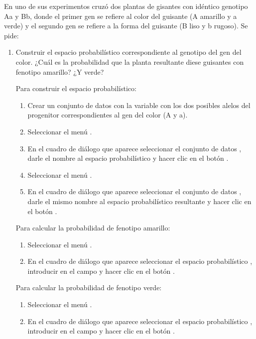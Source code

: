 \begin{enumerate}[leftmargin=*]
En uno de sus experimentos cruzó dos plantas de gisantes con idéntico genotipo Aa y Bb, donde el primer gen se refiere al color del guisante
(A amarillo y a verde) y el segundo gen se refiere a la forma del guisante (B liso y b rugoso). Se pide:
\begin{enumerate}
\item Construir el espacio probabilístico correspondiente al genotipo del gen del color. 
¿Cuál es la probabilidad que la planta resultante diese guisantes con fenotipo amarillo? 
¿Y verde?
\begin{indicacion}
Para construir el espacio probabilístico: 
\begin{enumerate}
\item Crear un conjunto de datos  con la variable  con los dos posibles alelos del
progenitor correspondientes al gen del color (A y a).
\item Seleccionar el menú .
\item En el cuadro de diálogo que aparece seleccionar el conjunto de datos , darle el nombre
 al espacio probabilístico y hacer clic en el botón .
\item Seleccionar el menú .
\item En el cuadro de diálogo que aparece seleccionar el conjunto de datos , darle el mismo nombre al espacio
probabilístico resultante y hacer clic en el botón . 
\end{enumerate}
Para calcular la probabilidad de fenotipo amarillo:
\begin{enumerate}
\item Seleccionar el menú .
\item En el cuadro de diálogo que aparece seleccionar el espacio probabilístico , introducir
 en el campo  y hacer clic en el botón
.
\end{enumerate}
Para calcular la probabilidad de fenotipo verde:
\begin{enumerate}
\item Seleccionar el menú .
\item En el cuadro de diálogo que aparece seleccionar el espacio probabilístico , introducir
 en el campo  y hacer clic en el botón
.
\end{enumerate}
\end{indicacion}


\end{enumerate}
\end{enumerate}
